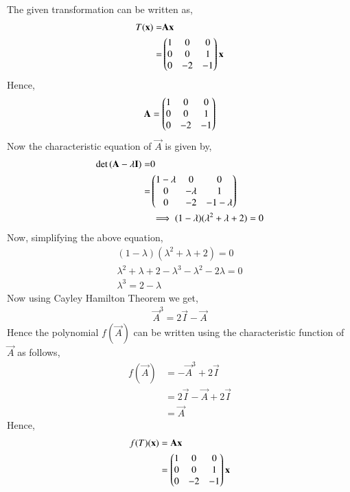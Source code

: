 The given transformation can be written as,
\begin{align}
T(\mathbf{x})=&\mathbf{A}\mathbf{x}\\
=&\begin{pmatrix}1&0&0\\0&0&1\\0&-2&-1\end{pmatrix}\mathbf{x}
\end{align}
Hence,
\begin{align}
\mathbf{A}=\begin{pmatrix}1&0&0\\0&0&1\\0&-2&-1\end{pmatrix}
\end{align}
Now the characteristic equation of $\vec{A}$ is given by,
\begin{align}
\det{(\mathbf{A} - \lambda \mathbf{I})} =&0\\
=&\begin{pmatrix}1-\lambda&0&0\\0&-\lambda&1\\0&-2&-1-\lambda\end{pmatrix}\\
&\implies(1-\lambda)(\lambda^2 +\lambda+2) =0
\end{align}
Now, simplifying the above equation,
\begin{align}
(1-\lambda)(\lambda^2 +\lambda+2) =0\\
\lambda^2 +\lambda+2-\lambda^3-\lambda^2-2\lambda=0\\
\lambda^3=2-\lambda
\end{align}
 Now using Cayley Hamilton Theorem we get,
\begin{align}
\vec{A}^3=2\vec{I}-\vec{A}
\end{align}
Hence the polynomial $f(\vec{A})$ can be written using the characteristic function of $\vec{A}$ as follows,
\begin{align}
f(\vec{A}) &= -\vec{A}^3 + 2\vec{I}\\
&= 2\vec{I}-\vec{A}+2\vec{I}\\
&= \vec{A}
\end{align}
Hence,
\begin{align}
f(T)(\mathbf{x})&=\mathbf{A}\mathbf{x}\\
&=\begin{pmatrix}1&0&0\\0&0&1\\0&-2&-1\end{pmatrix}\mathbf{x}
\end{align}

